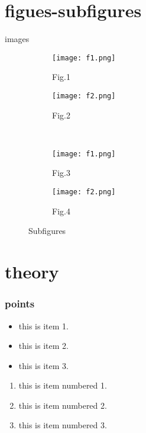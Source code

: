 \documentclass{beamer}
\begin{document}
\section{figues-subfigures}
  \begin{frame}{images} 
    \begin{figure}
        \centering
        \begin{center}
        \begin{subfigure}{0.3\textwidth}
        \texttt{[image: f1.png]}
        \caption{Fig.1}
        \end{subfigure}
        \begin{subfigure}{0.3\textwidth}
        \texttt{[image: f2.png]}
        \caption{Fig.2}
        \end{subfigure}
        \\
        \begin{subfigure}{0.3\textwidth}
        \texttt{[image: f1.png]}
        \caption{Fig.3}
        \end{subfigure}
        \begin{subfigure}{0.3\textwidth}
        \texttt{[image: f2.png]}
        \caption{Fig.4}
        \end{subfigure}        
        \end{center}
        \caption{Subfigures}
    \end{figure}  
\end{frame}
\section{theory}
\begin{frame}
\frametitle{points}
\begin{itemize}
    \item this is item 1.\\
    \item this is item 2.\\
    \item this is item 3.\\
\end{itemize}
 \begin{enumerate}
     \item this is item numbered 1.\\
     \item this is item numbered 2.\\
     \item this is item numbered 3.\\
 \end{enumerate}   
\end{frame}
\end{document}
